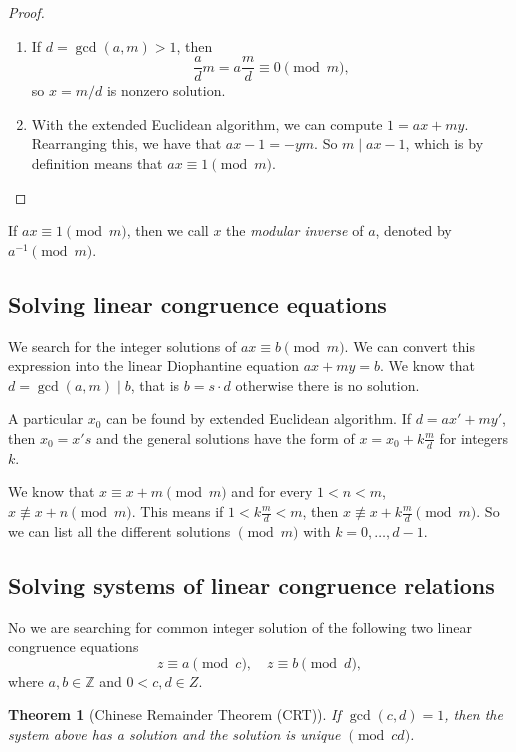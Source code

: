 \documentclass{article}
\newcommand{\Z}{\mathbb{Z}}
\newtheorem{theorem}{Theorem}
\begin{document}
\begin{proof}
    \begin{enumerate}
        \item
            If $d = \gcd(a, m) > 1$, then
            \[
                \frac{a}{d}m = a\frac{m}{d} \equiv 0 \pmod{m},
            \]
            so $x = m / d$ is nonzero solution.
        \item
            With the extended Euclidean algorithm, we can compute $1 = ax + my$.
            Rearranging this, we have that $ax - 1 = -ym$. So $m \mid ax - 1$, which is by definition means that $ax \equiv 1 \pmod{m}$.
    \end{enumerate}
\end{proof}
If $ax \equiv 1 \pmod{m}$, then we call $x$ the \emph{modular inverse} of $a$, denoted by $a^{-1}\pmod{m}$.

\subsection{Solving linear congruence equations}

We search for the integer solutions of $ax \equiv b \pmod{m}$.
We can convert this expression into the linear Diophantine equation $ax+my=b$.
We know that $d = \gcd(a,m) \mid b$, that is $b = s \cdot d$ otherwise there is no solution.

A particular $x_0$ can be found by extended Euclidean algorithm.
If $d = ax'+my'$, then $x_0=x's$ and the general solutions have the form of $x = x_0 + k\frac{m}{d}$ for integers $k$.

We know that $x \equiv x + m \pmod{m}$ and for every $1 < n < m$, $x \not \equiv x+n \pmod{m}$.
This means if $1 < k\frac{m}{d} < m$, then $x \not\equiv x+k\frac{m}{d} \pmod{m}$.
So we can list all the different solutions $\pmod{m}$ with $k=0,\ldots,d-1$.

\subsection{Solving systems of linear congruence relations}

No we are searching for common integer solution of the following two linear congruence equations
\[
    z \equiv a \pmod{c}, \quad z \equiv b \pmod{d},
\]
where $a, b \in \Z$ and $0 < c,d \in Z$.

\begin{theorem}[Chinese Remainder Theorem (CRT)]
    If $\gcd(c,d)=1$, then the system above has a solution and the solution is unique $\pmod{cd}$.
\end{theorem}
\end{document}
